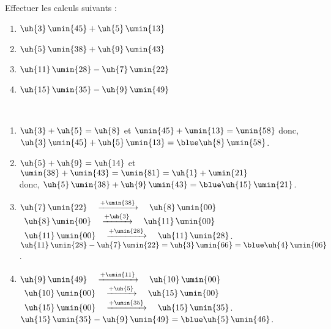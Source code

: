 \begin{colonne*exercice}
\bigskip



\bigskip

\begin{exercice} %
   Effectuer les calculs suivants :
   \begin{enumerate}
      \item $\uh{3}\,\umin{45}+\uh{5}\,\umin{13}$
      \item $\uh{5}\,\umin{38}+\uh{9}\,\umin{43}$
      \item $\uh{11}\,\umin{28}-\uh{7}\,\umin{22}$
      \item $\uh{15}\,\umin{35}-\uh{9}\,\umin{49}$
   \end{enumerate}
\end{exercice}

\begin{corrige}
   \ \\ [-5mm]
   \begin{enumerate}
      \item $\uh{3}+\uh{5} =\uh{8}$ et $\umin{45}+\umin{13} =\umin{58}$ donc, $\uh{3}\,\umin{45}+\uh{5}\,\umin{13} =\blue \uh{8}\,\umin{58}$.
      \item $\uh{5}+\uh{9} =\uh{14}$ et \\
         $\umin{38}+\umin{43} =\umin{81} =\uh{1}+\umin{21}$ \\
         donc, $\uh{5}\,\umin{38}+\uh{9}\,\umin{43} =\blue \uh{15}\,\umin{21}$.
      \item $\uh{7}\,\umin{22} \quad \xrightarrow{+\umin{38}} \quad \uh{8}\,\umin{00}$ \\
         \quad\, $\uh{8}\,\umin{00} \quad \xrightarrow{+\uh{3}} \quad \uh{11}\,\umin{00}$ \\
         \quad\, $\uh{11}\,\umin{00}\quad \xrightarrow{+\umin{28}} \quad \uh{11}\,\umin{28}$. \\   
         $\uh{11}\,\umin{28}-\uh{7}\,\umin{22} =\uh{3}\,\umin{66} =\blue \uh{4}\,\umin{06}$.
      \item $\uh{9}\,\umin{49} \quad \xrightarrow{+\umin{11}} \quad \uh{10}\,\umin{00}$ \\
         \quad\, $\uh{10}\,\umin{00} \quad \xrightarrow{+\uh{5}} \quad \uh{15}\,\umin{00}$ \\
         \quad\, $\uh{15}\,\umin{00}\quad \xrightarrow{+\umin{35}} \quad \uh{15}\,\umin{35}$. \\   
         $\uh{15}\,\umin{35}-\uh{9}\,\umin{49} =\blue \uh{5}\,\umin{46}$.
   \end{enumerate}
\end{corrige}


\end{colonne*exercice}
